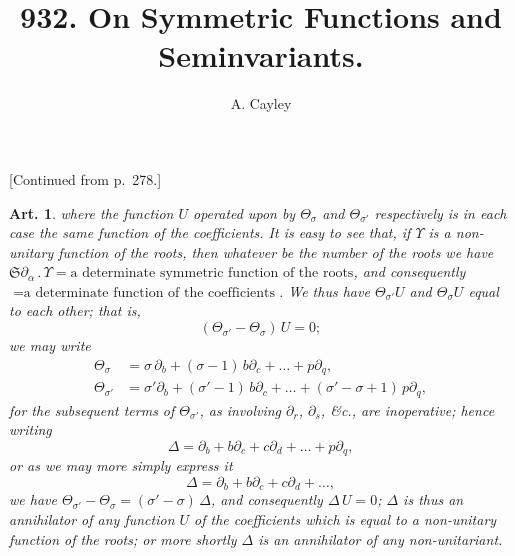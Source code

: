 \documentclass[11pt,a4paper]{article}
\title{\textbf{932.} On Symmetric Functions and Seminvariants.}
\author{A. Cayley}
\date{}
\theoremstyle{cayley}
\newtheorem{art}{Art.}[section]
\begin{document}
\maketitle
\thispagestyle{empty}
\setcounter{page}{279}

\begin{center}
[Continued from p.~278.]
\end{center}

\setcounter{art}{21}

\begin{art}
where the function $U$ operated upon by $\Theta_{\sigma}$ and $\Theta_{\sigma'}$ respectively is in each case the same function of the coefficients. It is easy to see that, if $\Upsilon$ is a non-unitary function of the roots, then whatever be the number of the roots we have $\mathfrak{S}\partial_{\alpha}\,.\,\Upsilon = \text{a determinate symmetric function of the roots}$, and consequently $= \text{a determinate function of the coefficients}$. We thus have $\Theta_{\sigma'} U$ and $\Theta_{\sigma} U$ equal to each other; that is,
\[
(\Theta_{\sigma'} - \Theta_{\sigma})\, U = 0;
\]
we may write
\begin{align*}
\Theta_{\sigma} &= \sigma\,\partial_{b} + (\sigma-1)\,b\partial_{c} + \ldots + p\partial_{q},\\
\Theta_{\sigma'} &= \sigma'\partial_{b} + (\sigma'-1)\,b\partial_{c} + \ldots + (\sigma'-\sigma+1)\,p\partial_{q},
\end{align*}
for the subsequent terms of $\Theta_{\sigma'}$, as involving $\partial_{r}$, $\partial_{s}$, \&c., are inoperative; hence writing
\[
\Delta = \partial_{b} + b\partial_{c} + c\partial_{d} + \ldots + p\partial_{q},
\]
or as we may more simply express it
\[
\Delta = \partial_{b} + b\partial_{c} + c\partial_{d} + \ldots,
\]
we have $\Theta_{\sigma'} - \Theta_{\sigma} = (\sigma' - \sigma)\,\Delta$, and consequently $\Delta\, U = 0$; $\Delta$ is thus an annihilator of any function $U$ of the coefficients which is equal to a non-unitary function of the roots; or more shortly $\Delta$ is an annihilator of any non-unitariant.
\end{art}
\end{document}
